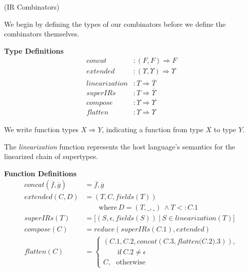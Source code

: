 \documentclass[preprint,10pt]{sigplanconf}
\theoremstyle{definition}
\theoremstyle{definition}
\begin{document}
\begin{defn}{(IR Combinators)}

We begin by defining the types of our combinators before we define the
combinators themselves.

\vspace{0.2cm}
{\bf Type Definitions}
{\small
\begin{align*}
\textit{concat}&        : (F, F) \Rightarrow F\\
\textit{extended}&      : (\Upsilon, \Upsilon) \Rightarrow \Upsilon\\
\textit{linearization}& : T \Rightarrow \overline{T}\\
\textit{superIRs}&      : T \Rightarrow \overline{\Upsilon}\\
\textit{compose}&       : \Upsilon \Rightarrow \Upsilon\\
\textit{flatten}&       : \Upsilon \Rightarrow \Upsilon
\end{align*}
}%

We write function types $X \Rightarrow Y$, indicating a function from type $X$
to type $Y$.

The \textit{linearization} function represents the host language's semantics for the
linearized chain of supertypes.\footnotemark[1]

\vspace{0.3cm}

{\bf Function Definitions}
{\small
\begin{align*}
\textit{concat}(\overline{f}, \overline{g})& = \overline{f}, \overline{g}\\
\textit{extended}(C, D)&                     = (T, C, \textit{fields}(T))\\
                       &                       \qquad \mbox{where}~D = (T, \_, \_)~\land T <: C.1\\
\textit{superIRs}(T)&                        = \lbrack(S, \epsilon, \textit{fields}(S))~|~S\in \textit{linearization}(T)\rbrack\\
\textit{compose}(C)&                         = \textit{reduce}(\textit{superIRs}(C.1),\textit{extended})\\
\textit{flatten}(C)&                         =\left\{ \begin{array}{l}
                                                (C.1, C.2, \textit{concat}(C.3, \textit{flatten(C.2).3})),\\
                                                \qquad\mbox{if}~C.2\neq\epsilon\\
                                                C,~~~\mbox{otherwise}
                                              \end{array} \right.
\end{align*}
}%



\end{defn}
\end{document}
